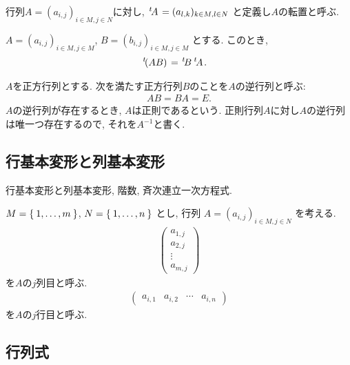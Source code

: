 \begin{definition}
行列$A=(a_{i,j})_{i\in M, j\in N}$に対し,
${\left.^{t}\!A\right.}=(a_{l,k})_{k\in M, l\in N}$
と定義し$A$の転置と呼ぶ.
\end{definition}
\begin{prop}
$A=(a_{i,j})_{i\in M, j\in M}$,
$B=(b_{i,j})_{i\in M, j\in M}$
とする.
このとき,
\begin{align*}
{\left.^{t}\!(AB)\right.}&={\left.^{t}\!B\right.}{\left.^{t}\!A\right.}.
\end{align*}
\end{prop}

\begin{definition}
$A$を正方行列とする.
次を満たす正方行列$B$のことを$A$の逆行列と呼ぶ:
\begin{align*}
AB=BA=E.
\end{align*}
$A$の逆行列が存在するとき, $A$は正則であるという.
正則行列$A$に対し$A$の逆行列は唯一つ存在するので,
それを$A^{-1}$と書く.
\end{definition}

\subsection{行基本変形と列基本変形}
行基本変形と列基本変形, 階数, 斉次連立一次方程式.

$M=\Set{1,\ldots,m}$,
$N=\Set{1,\ldots,n}$
とし,
行列
$A=(a_{i,j})_{i\in M, j\in N}$
を考える.
\begin{align*}
\begin{pmatrix}
a_{1,j}\\a_{2,j}\\\vdots \\a_{m,j}
\end{pmatrix}
\end{align*}
を$A$の$j$列目と呼ぶ.
\begin{align*}
\begin{pmatrix}
a_{i,1}& a_{i,2}&\cdots &a_{i,n}
\end{pmatrix}
\end{align*}
を$A$の$j$行目と呼ぶ.



\subsection{行列式}


